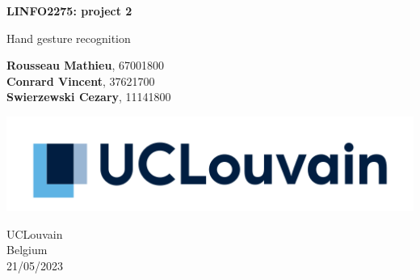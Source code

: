\begin{titlepage}
	\begin{center}
		\vspace*{1cm}
			
		\Huge
		\textbf{LINFO2275: project 2}
			
		\vspace{0.5cm}
		\LARGE
		Hand gesture recognition
			
		\vspace{2.5cm}
		
		\Large
		\textbf{Rousseau Mathieu}, 67001800 \\
		\textbf{Conrard Vincent}, 37621700 \\
		\textbf{Swierzewski Cezary}, 11141800
			
		\vfill
			
		\vspace{0.8cm}
			
		\includegraphics[width=\textwidth]{figures/logo_ucl.png}
	
		\vspace{0.8cm}
			
		\Large
		UCLouvain \\
		Belgium \\
		21/05/2023
	\end{center}
  \end{titlepage}